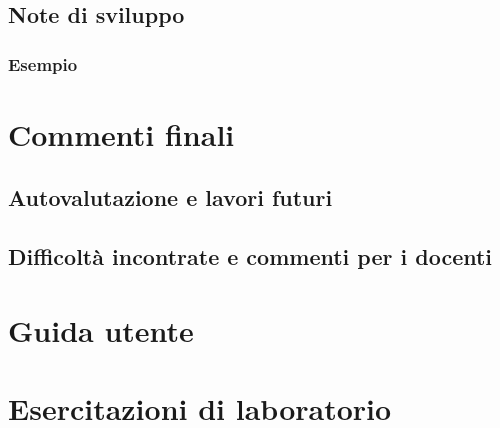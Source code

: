 \documentclass{article}
\begin{document}
\subsection{Note di sviluppo}
\subsubsection{Esempio}

\section{Commenti finali}
\subsection{Autovalutazione e lavori futuri}
\subsection{Difficoltà incontrate e commenti per i docenti}

\appendix
\section{Guida utente}
\section{Esercitazioni di laboratorio}
\end{document}
